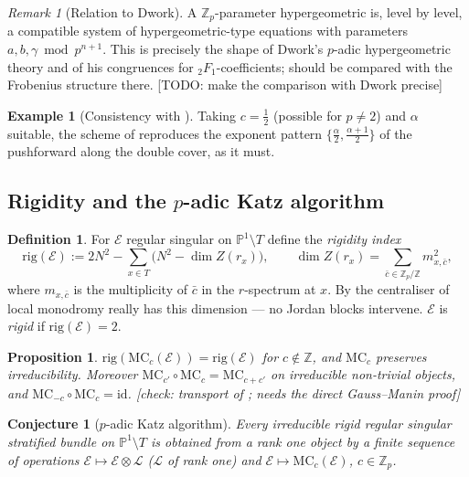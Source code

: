 \documentclass[11pt,reqno]{amsart}
\newcommand{\TODO}[1]{{\color{red}\textsf{[TODO: #1]}}}
\newcommand{\CHECK}[1]{{\color{blue!70!black}\textsf{[check: #1]}}}
\newcommand{\Zp}{\mathbb{Z}_p}
\newcommand{\ZZ}{\mathbb{Z}}
\newcommand{\PP}{\mathbb{P}}
\newcommand{\cE}{\mathcal{E}}
\newcommand{\cL}{\mathcal{L}}
\newcommand{\id}{\mathrm{id}}
\newcommand{\MC}{\mathrm{MC}}
\newcommand{\rig}{\mathrm{rig}}
\theoremstyle{plain}
\newtheorem{proposition}[theorem]{Proposition}
\newtheorem{conjecture}[theorem]{Conjecture}
\theoremstyle{definition}
\newtheorem{definition}[theorem]{Definition}
\newtheorem{example}[theorem]{Example}
\theoremstyle{remark}
\newtheorem{remark}[theorem]{Remark}
\numberwithin{equation}{section}
\begin{document}
\begin{remark}[Relation to Dwork]
A $\Zp$-parameter hypergeometric is, level by level, a compatible system
of hypergeometric-type equations with parameters
$a,b,\gamma\bmod p^{n+1}$.  This is precisely the shape of Dwork's
$p$-adic hypergeometric theory and of his congruences for
${}_2F_1$-coefficients;  should be compared with the
Frobenius structure there.
\TODO{make the comparison with Dwork precise}
\end{remark}

\begin{example}[Consistency with ]
Taking $c=\tfrac12$ (possible for $p\ne2$) and $\alpha$ suitable, the
scheme of  reproduces the exponent pattern
$\{\tfrac\alpha2,\tfrac{\alpha+1}2\}$ of the pushforward along the double
cover, as it must.
\end{example}

\subsection{Rigidity and the $p$-adic Katz algorithm}

\begin{definition}
For $\cE$ regular singular on $\PP^1\setminus T$ define the
\emph{rigidity index}
\[
   \rig(\cE):=2N^2-\sum_{x\in T}\bigl(N^2-\dim Z(r_x)\bigr),
   \qquad
   \dim Z(r_x)=\sum_{\bar c\in\Zp/\ZZ}m_{x,\bar c}^2 ,
\]
where $m_{x,\bar c}$ is the multiplicity of $\bar c$ in the $r$-spectrum
at $x$.  By  the centraliser of local monodromy
really has this dimension --- no Jordan blocks intervene.  $\cE$ is
\emph{rigid} if $\rig(\cE)=2$.
\end{definition}

\begin{proposition}\label{prop:rigMC}
$\rig(\MC_c(\cE))=\rig(\cE)$ for $c\notin\ZZ$, and $\MC_c$ preserves
irreducibility.  Moreover $\MC_{c'}\circ\MC_c=\MC_{c+c'}$ on irreducible
non-trivial objects, and $\MC_{-c}\circ\MC_c=\id$.
\CHECK{transport of \cite[6.0]{Katz2}; needs the direct Gauss--Manin proof}
\end{proposition}

\begin{conjecture}[$p$-adic Katz algorithm]\label{conj:katzalg}
Every irreducible rigid regular singular stratified bundle on
$\PP^1\setminus T$ is obtained from a rank one object by a finite sequence
of operations $\cE\mapsto\cE\otimes\cL$ ($\cL$ of rank one) and
$\cE\mapsto\MC_c(\cE)$, $c\in\Zp$.
\end{conjecture}
\end{document}
